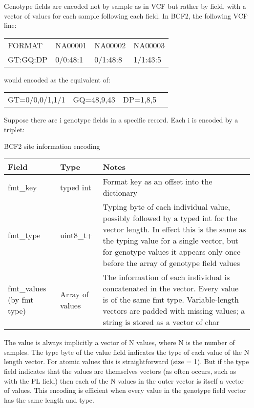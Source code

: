 \documentclass[8pt]{article}
\begin{document}
Genotype fields are encoded not by sample as in VCF but rather by field, with a vector of values for each sample following each field.  In BCF2, the following VCF line:

\vspace{0.3cm}
\begin{tabular}{l l l l}
FORMAT & NA00001 & NA00002 & NA00003 \\
GT:GQ:DP & 0/0:48:1 & 0/1:48:8 & 1/1:43:5 \\
\end{tabular}
\vspace{0.3cm}

would encoded as the equivalent of:

\vspace{0.3cm}
\begin{tabular}{l l l l}
GT=0/0,0/1,1/1 & GQ=48,9,43 & DP=1,8,5
\end{tabular}
\vspace{0.3cm}

Suppose there are i genotype fields in a specific record.  Each i is encoded by a triplet:

BCF2 site information encoding

\vspace{0.3cm}
\small
\begin{tabular}{ | p{2cm} | p{2.5cm} | p{9.5cm} | } \hline
Field & Type & Notes \\ \hline
fmt\_key & typed int & Format key as an offset into the dictionary \\ \hline
fmt\_type & uint8\_t+ & Typing byte of each individual value, possibly followed by a typed int for the vector length.  In effect this is the same as the typing value for a single vector, but for genotype values it appears only once before the array of genotype field values \\ \hline
fmt\_values	(by fmt type) & Array of values & The information of each individual is concatenated in the vector.  Every value is of the same fmt type.  Variable-length vectors are padded with missing values; a string is stored as a vector of char \\  \hline
\end{tabular}
\normalsize
\vspace{0.3cm}

The value is always implicitly a vector of N values, where N is the number of samples.  The type byte of the value field indicates the type of each value of the N length vector.  For atomic values this is straightforward (size = 1).  But if the type field indicates that the values are themselves vectors (as often occurs, such as with the PL field) then each of the N values in the outer vector is itself a vector of values.  This encoding is efficient when every value in the genotype field vector has the same length and type.
\end{document}
